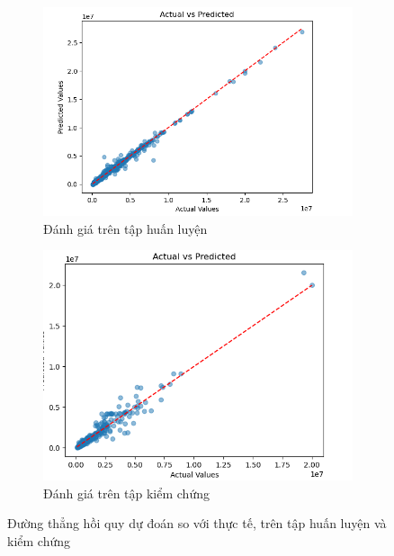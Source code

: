 \begin{figure}[H]
    \centering
    \begin{subfigure}[b]{0.5131\textwidth}
        \centering
        \includegraphics[width=\linewidth]{img/actualtrain.png}
        \caption{Đánh giá trên tập huấn luyện}
        \label{fig:PCAactual-linear-train}
    \end{subfigure}
    \hfill
    \begin{subfigure}[b]{0.465\textwidth}
        \centering
        \includegraphics[width=\linewidth]{img/actualval.png}
        \caption{Đánh giá trên tập kiểm chứng}
        \label{fig:PCAactual-linear-valid}
    \end{subfigure}
    \caption{Đường thẳng hồi quy dự đoán so với thực tế, trên tập huấn luyện và kiểm chứng} 
    \label{fig:PCAactual-linear-eval}
\end{figure}

\pagebreak